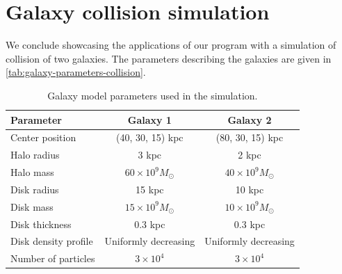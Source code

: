 \section{Galaxy collision simulation}
We conclude showcasing the applications of our program with a simulation of collision of two galaxies.
The parameters describing the galaxies are given in \autoref{tab:galaxy-parameters-collision}.
\begin{table}[htp]
    \centering
    \begin{tabular}{|l|c|c|}
        \hline
        \textbf{Parameter}   & \textbf{Galaxy 1}        & \textbf{Galaxy 2}        \\
        \hline
        Center position      & (40, 30, 15) kpc         & (80, 30, 15) kpc         \\
        Halo radius          & 3 kpc                    & 2 kpc                    \\
        Halo mass            & $60 \times 10^9 M_\odot$ & $40 \times 10^9 M_\odot$ \\
        Disk radius          & 15 kpc                   & 10 kpc                   \\
        Disk mass            & $15 \times 10^9 M_\odot$ & $10 \times 10^9 M_\odot$ \\
        Disk thickness       & 0.3 kpc                  & 0.3 kpc                  \\
        Disk density profile & Uniformly decreasing     & Uniformly decreasing     \\
        Number of particles  & $3 \times 10^4$          & $3 \times 10^4$          \\
        \hline
    \end{tabular}
    \caption{Galaxy model parameters used in the simulation.}
    \label{tab:galaxy-parameters-collision}
\end{table}
